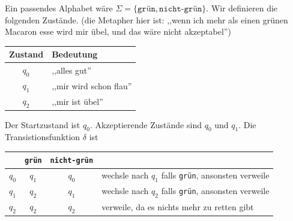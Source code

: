\begin{Bsp}
\begin{center}
\end{center}
Ein passendes Alphabet wäre $\Sigma = \{\texttt{grün} , \texttt{nicht-grün} \}$.
Wir definieren die folgenden Zustände.
(die Metapher hier ist: ,,wenn ich mehr als einen grünen Macaron esse wird mir übel, und das wäre nicht akzeptabel'')
\begin{center}
\begin{tabular}{cl}
  Zustand & Bedeutung \\
  \hline
  $q_0$& ,,alles gut'' \\
  $q_1$& ,,mir wird schon flau'' \\
  $q_2$& ,,mir ist übel''
\end{tabular}
\end{center}
Der Startzustand ist $q_0$.
Akzeptierende Zustände sind $q_0$ und $q_1$.
Die Transistionsfunktion $\delta$ ist
\begin{center}
\begin{tabular}{cccl}
  &\texttt{grün} & \texttt{nicht-grün} \\
  \hline
  $q_0$ & $q_1$ & $q_0$ & wechsle nach $q_1$ falls \texttt{grün}, ansonsten verweile \\
  $q_1$ & $q_2$ & $q_1$ & wechsle nach $q_2$ falls \texttt{grün}, ansonsten verweile \\
  $q_2$  & $q_2$ & $q_2$ & verweile, da es nichts mehr zu retten gibt
\end{tabular}
\end{center}
\end{Bsp}


